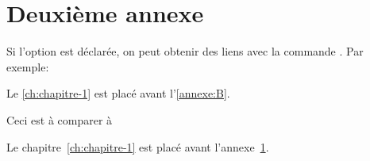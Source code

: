
\chapter{Deuxi\`eme annexe}
\label{annexe:B}

Si l'option \verb@hypertexte@ est d\'eclar\'ee, on peut obtenir des liens avec
la commande \verb@autoref@. Par exemple:
\begin{center}
Le \autoref{ch:chapitre-1} est plac\'e avant l'\autoref{annexe:B}.
\end{center}
Ceci est à comparer à
\begin{center}
Le chapitre~\ref{ch:chapitre-1} est plac\'e avant l'annexe~\ref{annexe:B}.
\end{center}